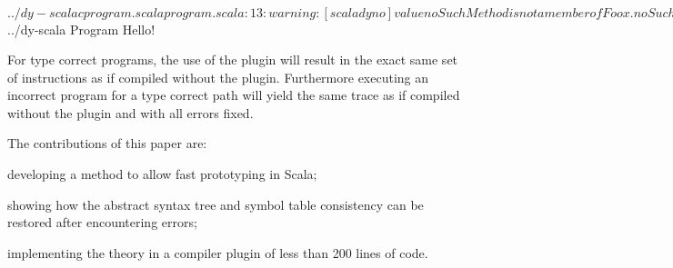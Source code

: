 \begin{lstlisting-nobreak}
$ ../dy-scalac program.scala
program.scala:13: warning: [scaladyno] value noSuchMethod is not a member of Foo
     x.noSuchMethod()
       ^
one warning found
$ ../dy-scala Program
Hello!
\end{lstlisting-nobreak}

For type correct programs, the use of the plugin will result in the exact same set of instructions as if compiled without the plugin. Furthermore executing an incorrect program for a type correct path will yield the same trace as if compiled without the plugin and with all errors fixed.

The contributions of this paper are:
\begin{packed_item}
\item developing a method to allow fast prototyping in Scala;
\item showing how the abstract syntax tree and symbol table consistency can be restored after encountering errors;
\item implementing the theory in a compiler plugin of less than 200 lines of code.
\end{packed_item}

